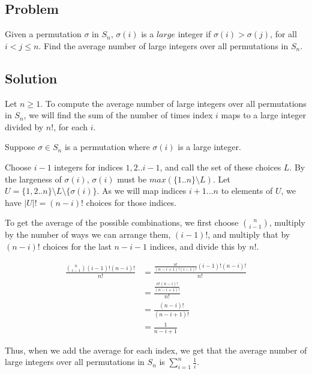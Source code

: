 \documentclass{article}
\begin{document}
\begin{center}\item \section*{Problem}\end{center}

Given a permutation $\sigma$ in $S_n$, $\sigma(i)$ is a $large$ integer if $\sigma(i) > \sigma(j)$, for all $i < j \leq n$. Find the average number of large integers over all permutations in $S_n$.

\begin{center}\item \section*{Solution}\end{center}

Let $n \geq 1$. To compute the average number of large integers over all permutations in $S_n$, we will find the sum of the number of times index $i$ maps to a large integer divided by $n!$, for each $i$.

Suppose $\sigma \in S_n$ is a permutation where $\sigma(i)$ is a large integer.

Choose $i-1$ integers for indices $1,2..i-1$, and call the set of these choices $L$. By the largeness of $\sigma(i)$, $\sigma(i)$ must be 
$max(\{1..n\}\setminus L)$.
Let $U = \{1,2..n\}\setminus L \setminus \{\sigma(i)\}$.
As we will map indices $i+1...n$ to elements of $U$, we have $|U|!=(n-i)!$
choices for those indices.

To get the average of the possible combinations, we first choose ${n\choose {i-1}}$, multiply by the number of ways we can arrange them, $(i-1)!$, and multiply that by $(n-i)!$ choices for the last $n-i-1$ indices, and divide this by $n!$.

\begin{align*}
    \frac{{n\choose {i-1}}(i-1)!(n-i)!}{n!}
  &=\frac{\frac{n!}{(n-i+1)!(i-1)!}(i-1)!(n-i)!}{n!}
\\&=\frac{\frac{n!(n-i)!}{(n-i+1)!}}{n!}
\\&=\frac{(n-i)!}{(n-i+1)!}
\\&=\frac{1}{n-i+1}
\end{align*}

Thus, when we add the average for each index, we get that the average number of large integers over all permutations in $S_n$ is 
$\displaystyle\sum\limits_{i=1}^n \frac{1}{i}$. 
\end{document}
